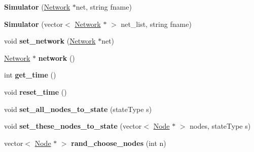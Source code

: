 \begin{DoxyCompactItemize}
\item 
\hypertarget{classSimulator_afac88757024c1074b6b0c3c39c441010}{}{\bfseries Simulator} (\hyperlink{classNetwork}{Network} $\ast$net, string fname)\label{classSimulator_afac88757024c1074b6b0c3c39c441010}

\item 
\hypertarget{classSimulator_a476a63ef9b628c54d0129ffe270465ed}{}{\bfseries Simulator} (vector$<$ \hyperlink{classNetwork}{Network} $\ast$ $>$ net\+\_\+list, string fname)\label{classSimulator_a476a63ef9b628c54d0129ffe270465ed}

\item 
\hypertarget{classSimulator_a340d96c82d8ff7786949a620dee2ee53}{}void {\bfseries set\+\_\+network} (\hyperlink{classNetwork}{Network} $\ast$net)\label{classSimulator_a340d96c82d8ff7786949a620dee2ee53}

\item 
\hypertarget{classSimulator_a0255e53faefcf2acd6b594551f7e3a92}{}\hyperlink{classNetwork}{Network} $\ast$ {\bfseries network} ()\label{classSimulator_a0255e53faefcf2acd6b594551f7e3a92}

\item 
\hypertarget{classSimulator_a775d86392b65bf43adadba7a8c6286fd}{}int {\bfseries get\+\_\+time} ()\label{classSimulator_a775d86392b65bf43adadba7a8c6286fd}

\item 
\hypertarget{classSimulator_a97fa0d0068e759f345ff06cc5436fc3a}{}void {\bfseries reset\+\_\+time} ()\label{classSimulator_a97fa0d0068e759f345ff06cc5436fc3a}

\item 
\hypertarget{classSimulator_a20c0e44c291569c4ea17cc93f7b069bf}{}void {\bfseries set\+\_\+all\+\_\+nodes\+\_\+to\+\_\+state} (state\+Type s)\label{classSimulator_a20c0e44c291569c4ea17cc93f7b069bf}

\item 
\hypertarget{classSimulator_a9b6c9f8c97a6142c39b95bb3d77cf18c}{}void {\bfseries set\+\_\+these\+\_\+nodes\+\_\+to\+\_\+state} (vector$<$ \hyperlink{classNode}{Node} $\ast$ $>$ nodes, state\+Type s)\label{classSimulator_a9b6c9f8c97a6142c39b95bb3d77cf18c}

\item 
\hypertarget{classSimulator_a61a761f7efaf7b63b7a8dff3ae50f00f}{}vector$<$ \hyperlink{classNode}{Node} $\ast$ $>$ {\bfseries rand\+\_\+choose\+\_\+nodes} (int n)\label{classSimulator_a61a761f7efaf7b63b7a8dff3ae50f00f}


\end{DoxyCompactItemize}
